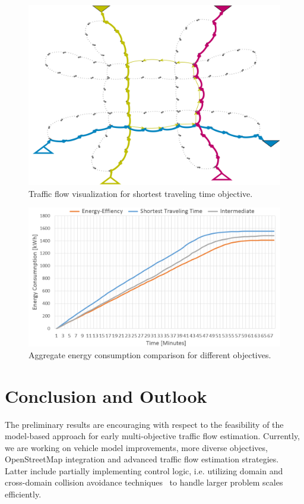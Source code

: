 \documentclass[conference]{../cls/IEEEtran}
\begin{document}
\begin{figure}[t!]
	\centering
	\includegraphics[width=0.925\columnwidth]{../gfx/graph2.png}
	\caption{Traffic flow visualization for shortest traveling time objective.}
	\label{figure:graph}
\end{figure}

\begin{figure}[t!]
	\centering
	\includegraphics[width=0.925\columnwidth]{../gfx/chart2.png}
	\caption{Aggregate energy consumption comparison for different objectives.}
	\label{figure:chart}
\end{figure}

\section{Conclusion and Outlook}

The preliminary results are encouraging with respect to the feasibility of the
model-based approach for early multi-objective traffic flow estimation.
Currently, we are working on vehicle model
improvements, more diverse objectives, OpenStreetMap integration and advanced 
traffic flow estimation strategies. Latter include partially implementing
control logic, i.e. utilizing domain and cross-domain collision
avoidance techniques~\cite{Shi2012} to handle larger problem scales efficiently.




\end{document}
